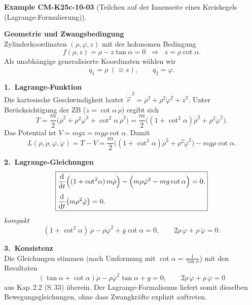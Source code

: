 \documentclass[10pt, letterpaper]{article}
\newcommand{\CustomHeading}[3]{%
  \par\medskip\noindent%
  \textbf{#1 #2} \textnormal{(#3)}.\enskip%
}
\newenvironment{EXA}[2]{\begin{unitbox}\CustomHeading{Example}{#1}{#2}}{\end{unitbox}}
\begin{document}
\begin{EXA}{CM-K25c-10-03}{Teilchen auf der Innenseite eines Kreiskegels (Lagrange-Formulierung)}
\textbf{Geometrie und Zwangsbedingung}\\
Zylinderkoordinaten $(\rho,\varphi,z)$ mit der holonomen Bedingung  
\[
  f(\rho,z)=\rho-z\tan\alpha=0
  \;\;\Longrightarrow\;\;
  z=\rho\cot\alpha .
\]
Als unabhängige generalisierte Koordinaten wählen wir
\[
  q_1=\rho\;(\equiv s), 
  \qquad 
  q_2=\varphi .
\]

\textbf{1.\ Lagrange-Funktion}\\
Die kartesische Geschwindigkeit lautet
\(
  \dot{\vec r}^{\,2}=\dot\rho^{2}+\rho^{2}\dot\varphi^{2}+\dot z^{2}.
\)
Unter Berücksichtigung der ZB ($\dot z=\cot\alpha\,\dot\rho$) ergibt sich  
\[
  T=\frac{m}{2}\!\bigl(\dot\rho^{2}+\rho^{2}\dot\varphi^{2}
        +\cot^{2}\!\alpha\,\dot\rho^{2}\bigr)
    =\frac{m}{2}\!\bigl((1+\cot^{2}\!\alpha)\dot\rho^{2}
        +\rho^{2}\dot\varphi^{2}\bigr).
\]
Das Potential ist $V=m g z=m g\rho\cot\alpha$.  
Damit
\[
  L(\rho,\dot\rho,\varphi,\dot\varphi)
  =T-V
  =\frac{m}{2}\!\bigl((1+\cot^{2}\!\alpha)\dot\rho^{2}
        +\rho^{2}\dot\varphi^{2}\bigr)
   -mg\rho\cot\alpha .
\]

\textbf{2.\ Lagrange-Gleichungen}\\[-6pt]
\[
\boxed{
  \begin{aligned}
    &\frac{\mathrm d}{\mathrm dt}
       \Bigl((1+\cot^{2}\!\alpha)\,m\dot\rho\Bigr)
      -\Bigl(m\rho\dot\varphi^{2}-mg\cot\alpha\Bigr)=0,\\[4pt]
    &\frac{\mathrm d}{\mathrm dt}\bigl(m\rho^{2}\dot\varphi\bigr)=0.
  \end{aligned}}
\]
\textit{kompakt}
\[
  (1+\cot^{2}\!\alpha)\,\ddot\rho-\rho\dot\varphi^{2}
  +g\cot\alpha=0,
  \qquad
  2\dot\rho\,\dot\varphi+\rho\,\ddot\varphi=0.
\]

\textbf{3.\ Konsistenz}\\
Die Gleichungen stimmen (nach Umformung mit  
$\cot\alpha=\tfrac{1}{\tan\alpha}$) mit den Resultaten 
\[
  (\tan\alpha+\cot\alpha)\ddot\rho-\rho\dot\varphi^{2}\tan\alpha+g=0,
  \qquad
  2\dot\rho\,\dot\varphi+\rho\,\ddot\varphi=0
\]
aus Kap.\,2.2 (S.\,33) überein.  
Der Lagrange-Formalismus liefert somit dieselben Bewegungsgleichungen, 
ohne dass Zwangkräfte explizit auftreten.
\end{EXA}





\begin{center}
\end{center}
\end{document}

